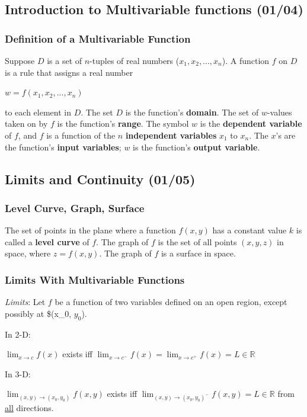 \documentclass[
  letterpaper,
  DIV=11,
  numbers=noendperiod]{scrartcl}
\begin{document}
\hypertarget{introduction-to-multivariable-functions-0104}{%
\subsection{Introduction to Multivariable functions
(01/04)}\label{introduction-to-multivariable-functions-0104}}

\hypertarget{definition-of-a-multivariable-function}{%
\subsubsection{Definition of a Multivariable
Function}\label{definition-of-a-multivariable-function}}

Suppose \(D\) is a set of \(n\)-tuples of real numbers
(\(x_1, x_2, ..., x_n\)). A function \(f\) on \(D\) is a rule that
assigns a real number

\(w = f(x_1, x_2, ..., x_n)\)

to each element in \(D\). The set \(D\) is the function's
\textbf{domain}. The set of \(w\)-values taken on by \(f\) is the
function's \textbf{range}. The symbol \(w\) is the \textbf{dependent
variable} of \(f\), and \(f\) is a function of the \(n\)
\textbf{independent variables} \(x_1\) to \(x_n\). The \(x\)'s are the
function's \textbf{input variables}; \(w\) is the function's
\textbf{output variable}.

\hypertarget{limits-and-continuity-0105}{%
\subsection{Limits and Continuity
(01/05)}\label{limits-and-continuity-0105}}

\hypertarget{level-curve-graph-surface}{%
\subsubsection{Level Curve, Graph,
Surface}\label{level-curve-graph-surface}}

The set of points in the plane where a function \(f(x, y)\) has a
constant value \(k\) is called a \textbf{level curve} of \(f\). The
graph of \(f\) is the set of all points \((x, y, z)\) in space, where
\(z = f(x, y)\). The graph of \(f\) is a surface in space.

\hypertarget{limits-with-multivariable-functions}{%
\subsubsection{Limits With Multivariable
Functions}\label{limits-with-multivariable-functions}}

\emph{Limits}: Let \(f\) be a function of two variables defined on an
open region, except possibly at \$(x\_0, \(y_0\)).

In 2-D:

\(\lim_{x\rightarrow c} f(x)\) exists iff
\(\lim_{x\rightarrow c^-} f(x) = \lim_{x\rightarrow c^+} f(x) = L \in \mathbb{R}\)

In 3-D:

\(\lim_{(x, y) \rightarrow (x_0, y_0)} f(x, y)\) exists iff
\(\lim_{(x, y) \rightarrow (x_0, y_0)^-} f(x, y) = L \in \mathbb{R}\)
from \ul{all} directions.
\end{document}
